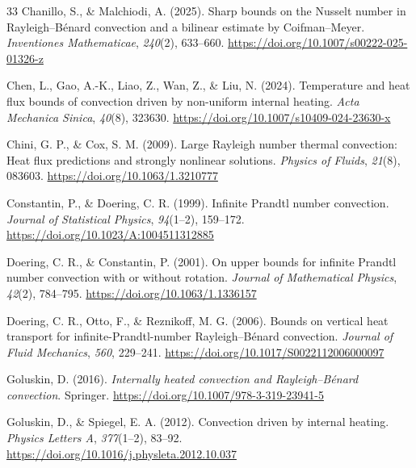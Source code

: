 \begin{thebibliography}{33}
Chanillo, S., \& Malchiodi, A. (2025). Sharp bounds on the Nusselt number in Rayleigh--Bénard convection and a bilinear estimate by Coifman--Meyer. \emph{Inventiones Mathematicae}, \emph{240}(2), 633--660. \url{https://doi.org/10.1007/s00222-025-01326-z}

Chen, L., Gao, A.-K., Liao, Z., Wan, Z., \& Liu, N. (2024). Temperature and heat flux bounds of convection driven by non-uniform internal heating. \emph{Acta Mechanica Sinica}, \emph{40}(8), 323630. \url{https://doi.org/10.1007/s10409-024-23630-x}

Chini, G. P., \& Cox, S. M. (2009). Large Rayleigh number thermal convection: Heat flux predictions and strongly nonlinear solutions. \emph{Physics of Fluids}, \emph{21}(8), 083603. \url{https://doi.org/10.1063/1.3210777}

Constantin, P., \& Doering, C. R. (1999). Infinite Prandtl number convection. \emph{Journal of Statistical Physics}, \emph{94}(1--2), 159--172. \url{https://doi.org/10.1023/A:1004511312885}

Doering, C. R., \& Constantin, P. (2001). On upper bounds for infinite Prandtl number convection with or without rotation. \emph{Journal of Mathematical Physics}, \emph{42}(2), 784--795. \url{https://doi.org/10.1063/1.1336157}

Doering, C. R., Otto, F., \& Reznikoff, M. G. (2006). Bounds on vertical heat transport for infinite-Prandtl-number Rayleigh--Bénard convection. \emph{Journal of Fluid Mechanics}, \emph{560}, 229--241. \url{https://doi.org/10.1017/S0022112006000097}

Goluskin, D. (2016). \emph{Internally heated convection and Rayleigh--Bénard convection}. Springer. \url{https://doi.org/10.1007/978-3-319-23941-5}

Goluskin, D., \& Spiegel, E. A. (2012). Convection driven by internal heating. \emph{Physics Letters A}, \emph{377}(1--2), 83--92. \url{https://doi.org/10.1016/j.physleta.2012.10.037}


\end{thebibliography}
